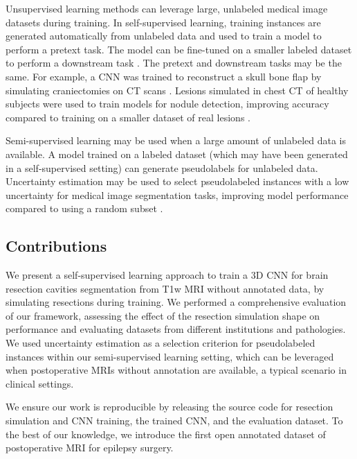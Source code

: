 Unsupervised learning methods can leverage large, unlabeled medical image datasets during training.
In self-supervised learning, training instances are generated automatically from unlabeled data and used to train a model to perform a pretext task. %
The model can be fine-tuned on a smaller labeled dataset to perform a downstream task \cite{chen_self-supervised_2019}.
The pretext and downstream tasks may be the same.
For example, a \ac{CNN} was trained to reconstruct a skull bone flap by simulating craniectomies on CT scans \cite{matzkin_self-supervised_2020}.
Lesions simulated in chest CT of healthy subjects were used to train models for nodule detection, improving accuracy compared to training on a smaller dataset of real lesions \cite{pezeshk_seamless_2017}.

Semi-supervised learning may be used when a large amount of unlabeled data is available.
A model trained on a labeled dataset (which may have been generated in a self-supervised setting) can generate pseudolabels for unlabeled data.
Uncertainty estimation may be used to select pseudolabeled instances with a low uncertainty for medical image segmentation tasks, improving model performance compared to using a random subset \cite{venturini_uncertainty_2020}.


\subsection{Contributions}

We present a self-supervised learning approach to train a 3D \ac{CNN} for brain resection cavities segmentation from \ac{T1w} \ac{MRI} without annotated data, by simulating resections during training.
We performed a comprehensive evaluation of our framework, assessing the effect of the resection simulation shape on performance and evaluating datasets from different institutions and pathologies.
We used uncertainty estimation as a selection criterion for pseudolabeled instances within our semi-supervised learning setting, which can be leveraged when postoperative \acp{MRI} without annotation are available, a typical scenario in clinical settings.

We ensure our work is reproducible by releasing the source code for resection simulation and \ac{CNN} training, the trained \ac{CNN}, and the evaluation dataset.
To the best of our knowledge, we introduce the first open annotated dataset of postoperative \ac{MRI} for epilepsy surgery.
